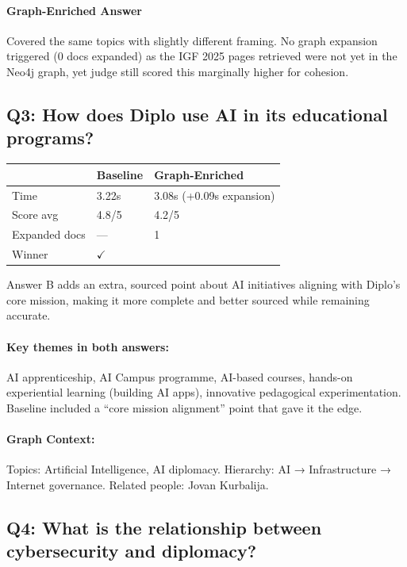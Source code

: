 \documentclass[11pt,a4paper]{article}
\newcommand{\basewinner}[1]{\textbf{\textcolor{basewin}{#1}}}
\begin{document}
\paragraph{Graph-Enriched Answer}
Covered the same topics with slightly different framing. No graph expansion triggered (0 docs expanded) as the IGF 2025 pages retrieved were not yet in the Neo4j graph, yet judge still scored this marginally higher for cohesion.

\subsection{Q3: How does Diplo use AI in its educational programs?}

\begin{tabularx}{\textwidth}{lXX}
\toprule
& \textbf{Baseline} & \textbf{Graph-Enriched} \\
\midrule
Time & 3.22s & 3.08s (+0.09s expansion) \\
Score avg & 4.8/5 & 4.2/5 \\
Expanded docs & --- & 1 \\
Winner & \basewinner{$\checkmark$} & \\
\bottomrule
\end{tabularx}

\begin{tcolorbox}[colback=judgebox, colframe=orange!40!black, title=Judge Reasoning]
Answer B adds an extra, sourced point about AI initiatives aligning with Diplo's core mission, making it more complete and better sourced while remaining accurate.
\end{tcolorbox}

\paragraph{Key themes in both answers:} AI apprenticeship, AI Campus programme, AI-based courses, hands-on experiential learning (building AI apps), innovative pedagogical experimentation. Baseline included a ``core mission alignment'' point that gave it the edge.

\paragraph{Graph Context:} Topics: Artificial Intelligence, AI diplomacy. Hierarchy: AI → Infrastructure → Internet governance. Related people: Jovan Kurbalija.

\subsection{Q4: What is the relationship between cybersecurity and diplomacy?}
\end{document}
